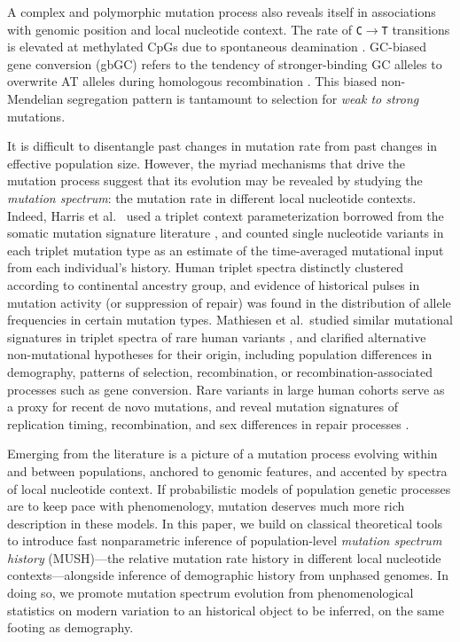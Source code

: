 \documentclass[11pt]{article}
\begin{document}
A complex and polymorphic mutation process also reveals itself in associations with genomic position and local nucleotide context.
The rate of \texttt{C$\rightarrow$T} transitions is elevated at methylated CpGs due to spontaneous deamination \cite{Hwang2004-bq, Segurel2014-ss}.
GC-biased gene conversion (gbGC) refers to the tendency of stronger-binding GC alleles to overwrite AT alleles during homologous recombination \cite{Galtier2007-eb,Duret2009-wn}.
This biased non-Mendelian segregation pattern is tantamount to selection for \emph{weak to strong} mutations.

It is difficult to disentangle past changes in mutation rate from past changes in effective population size.
However, the myriad mechanisms that drive the mutation process suggest that its evolution may be revealed by studying the \emph{mutation spectrum}: the mutation rate in different local nucleotide contexts.
Indeed, Harris et al.\ \cite{Harris2015-wi, Harris2017-fw} used a triplet context parameterization borrowed from the somatic mutation signature literature \cite{Alexandrov2013-oe, Helleday2014-xb}, and counted single nucleotide variants in each triplet mutation type as an estimate of the time-averaged mutational input from each individual's history.
Human triplet spectra distinctly clustered according to continental ancestry group, and evidence of historical pulses in mutation activity (or suppression of repair) was found in the distribution of allele frequencies in certain mutation types.
Mathiesen et al.\ studied similar mutational signatures in triplet spectra of rare human variants \cite{Mathieson2017-rc}, and clarified alternative non-mutational hypotheses for their origin, including population differences in demography, patterns of selection, recombination, or recombination-associated processes such as gene conversion.
Rare variants in large human cohorts serve as a proxy for recent de novo mutations, and reveal mutation signatures of replication timing, recombination, and sex differences in repair processes \cite{Carlson2018-rc, Agarwal2019-dn}.

Emerging from the literature is a picture of a mutation process evolving within and between populations, anchored to genomic features, and accented by spectra of local nucleotide context.
If probabilistic models of population genetic processes are to keep pace with phenomenology, mutation deserves much more rich description in these models.
In this paper, we build on classical theoretical tools to introduce fast nonparametric inference of population-level \emph{mutation spectrum history} (MUSH)---the relative mutation rate history in different local nucleotide contexts---alongside inference of demographic history from unphased genomes.
In doing so, we promote mutation spectrum evolution from phenomenological statistics on modern variation to an historical object to be inferred, on the same footing as demography.
\end{document}
